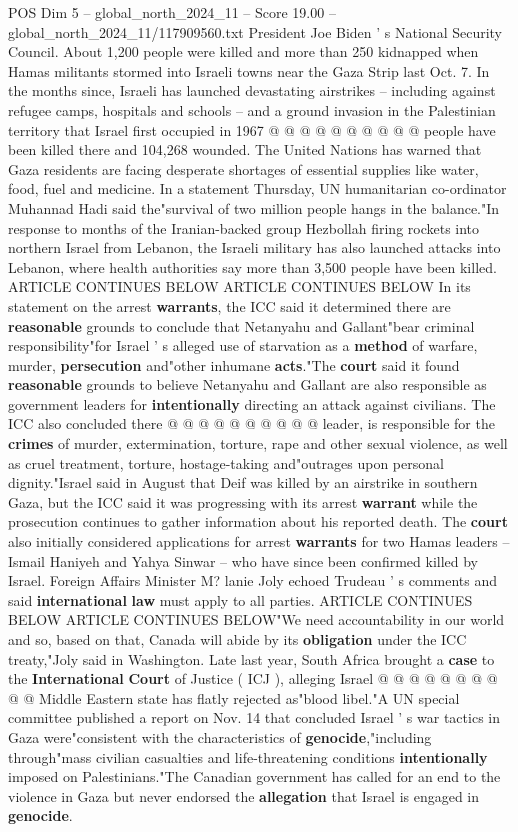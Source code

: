 \begin{textsample}{POS Dim 5 – global\_north\_2024\_11 – Score 19.00 – global\_north\_2024\_11/117909560.txt}
President Joe Biden ' s National Security Council.
About 1,200 people were killed and more than 250 kidnapped when Hamas militants stormed into Israeli towns near the Gaza Strip last Oct. 7.
In the months since, Israeli has launched devastating airstrikes -- including against refugee camps, hospitals and schools -- and a ground invasion in the Palestinian territory that Israel first occupied in 1967 @ @ @ @ @ @ @ @ @ @ people have been killed there and 104,268 wounded.
The United Nations has warned that Gaza residents are facing desperate shortages of essential supplies like water, food, fuel and medicine.
In a statement Thursday, UN humanitarian co-ordinator Muhannad Hadi said the"survival of two million people hangs in the balance."In response to months of the Iranian-backed group Hezbollah firing rockets into northern Israel from Lebanon, the Israeli military has also launched attacks into Lebanon, where health authorities say more than 3,500 people have been killed.
ARTICLE CONTINUES BELOW ARTICLE CONTINUES BELOW In its statement on the arrest \textbf{warrants}, the ICC said it determined there are \textbf{reasonable} grounds to conclude that Netanyahu and Gallant"bear criminal responsibility"for Israel ' s alleged use of starvation as a \textbf{method} of warfare, murder, \textbf{persecution} and"other inhumane \textbf{acts}."The \textbf{court} said it found \textbf{reasonable} grounds to believe Netanyahu and Gallant are also responsible as government leaders for \textbf{intentionally} directing an attack against civilians.
The ICC also concluded there @ @ @ @ @ @ @ @ @ @ leader, is responsible for the \textbf{crimes} of murder, extermination, torture, rape and other sexual violence, as well as cruel treatment, torture, hostage-taking and"outrages upon personal dignity."Israel said in August that Deif was killed by an airstrike in southern Gaza, but the ICC said it was progressing with its arrest \textbf{warrant} while the prosecution continues to gather information about his reported death.
The \textbf{court} also initially considered applications for arrest \textbf{warrants} for two Hamas leaders -- Ismail Haniyeh and Yahya Sinwar -- who have since been confirmed killed by Israel.
Foreign Affairs Minister M? lanie Joly echoed Trudeau ' s comments and said \textbf{international} \textbf{law} must apply to all parties.
ARTICLE CONTINUES BELOW ARTICLE CONTINUES BELOW"We need accountability in our world and so, based on that, Canada will abide by its \textbf{obligation} under the ICC treaty,"Joly said in Washington.
Late last year, South Africa brought a \textbf{case} to the \textbf{International} \textbf{Court} of Justice ( ICJ ), alleging Israel @ @ @ @ @ @ @ @ @ @ Middle Eastern state has flatly rejected as"blood libel."A UN special committee published a report on Nov. 14 that concluded Israel ' s war tactics in Gaza were"consistent with the characteristics of \textbf{genocide},"including through"mass civilian casualties and life-threatening conditions \textbf{intentionally} imposed on Palestinians."The Canadian government has called for an end to the violence in Gaza but never endorsed the \textbf{allegation} that Israel is engaged in \textbf{genocide}.

\end{textsample}
